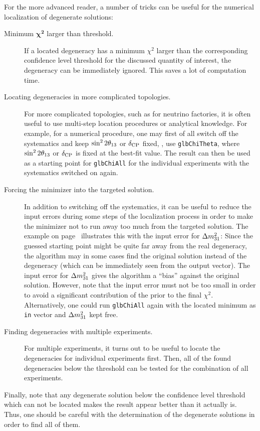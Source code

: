 For the more advanced reader, a number of tricks can be useful for the numerical localization of degenerate solutions:
\begin{description}
\item[Minimum $\boldsymbol{\chi^2}$ larger than threshold.] If a located degeneracy has a minimum $\chi^2$ larger than the corresponding confidence level threshold for the discussed quantity of interest, the degeneracy can be immediately ignored. This saves a lot of computation time.
\item[Locating degeneracies in more complicated topologies.] For more complicated topologies, such as for neutrino factories, it is often useful to use multi-step location procedures or analytical knowledge. For example, for a numerical procedure, one may first of all switch off the systematics and keep $\sin^2 2 \theta_{13}$ or $\delta_{\mathrm{CP}}$ fixed, \ie, use {\tt glbChiTheta}, where $\sin^2 2 \theta_{13}$ or $\delta_{\mathrm{CP}}$ is fixed at the best-fit value. The result can then be used as a starting point for {\tt glbChiAll} for the individual experiments with the systematics switched on again. 
\item[Forcing the minimizer into the targeted solution.]
In addition to switching off the systematics, it can be useful to reduce the input errors during some steps of the localization process in order to make the minimizer not to run away too much from the targeted solution.
The example on page~\pageref{ex:sgndeg} illustrates this with the
input error for $\Delta m_{31}^2$: Since the guessed starting point might be
quite far away from the real degeneracy, the algorithm may in some cases
find the original solution instead of the degeneracy (which can
be immediately seen from the output vector). The input error
for $\Delta m_{31}^2$ gives the algorithm a ``bias'' against the original solution.
However, note that the input error must not be too small in order
to avoid a significant contribution of the prior to the final $\chi^2$.
Alternatively, one could run {\tt glbChiAll} again with the located minimum
as {\tt in} vector and $\Delta m_{31}^2$ kept free.
\item[Finding degeneracies with multiple experiments.] For multiple experiments, it turns out to be useful to locate the degeneracies for individual experiments first. Then, all of the found degeneracies below the threshold can be tested for the combination of all experiments.
\end{description}
Finally, note that any degenerate solution below the confidence level threshold which can not be located makes the result appear better than it actually is. Thus, one should be careful with the determination of the degenerate solutions in order to find all of them.

